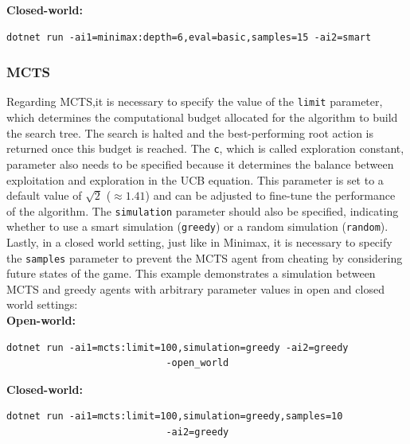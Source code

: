 \textbf{Closed-world: }
\begin{lstlisting}
dotnet run -ai1=minimax:depth=6,eval=basic,samples=15 -ai2=smart
\end{lstlisting}

\subsubsection{MCTS}

Regarding MCTS,it is necessary to specify the value of the \texttt{limit} parameter, which determines the computational budget allocated for the algorithm to build the search tree. The search is halted and the best-performing root action is returned once this budget is reached. The \texttt{c}, which is called exploration constant, parameter also needs to be specified because it determines the balance between exploitation and exploration in the UCB equation. This parameter is set to a default value of  $\sqrt{2}$ ($\approx 1.41$) and can be adjusted to fine-tune the performance of the algorithm. The \texttt{simulation} parameter should also be specified, indicating whether to use a smart simulation (\texttt{greedy}) or a random simulation (\texttt{random}). Lastly, in a closed world setting, just like in Minimax, it is necessary to specify the \texttt{samples} parameter to prevent the MCTS agent from cheating by considering future states of the game. This example demonstrates a simulation between MCTS and greedy agents with arbitrary parameter values in open and closed world settings: \\

\textbf{Open-world: }
\begin{lstlisting}
dotnet run -ai1=mcts:limit=100,simulation=greedy -ai2=greedy 
							-open_world
\end{lstlisting}

\textbf{Closed-world: }
\begin{lstlisting}
dotnet run -ai1=mcts:limit=100,simulation=greedy,samples=10 
							-ai2=greedy
\end{lstlisting}





